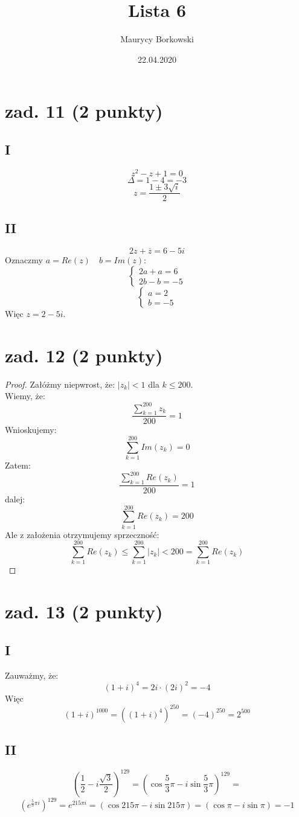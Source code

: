 \documentclass{article}
\title{Lista 6}
\date{22.04.2020}
\author{Maurycy Borkowski}
\begin{document}
\maketitle

\section{zad. 11 (2 punkty)}
\subsection*{I}
$$
z^2 - z + 1 = 0
$$
$$
\Delta = 1 - 4 = -3
$$
$$
z = \frac{1 \pm 3 \sqrt i}{2}
$$
\subsection*{II}
$$
2z + \overline{z} = 6 - 5i
$$
Oznaczmy $a = Re(z) \quad b = Im(z)$:
$$
\begin{cases} 2a + a = 6 \\ 2b - b = -5 \end{cases}
$$
$$
\begin{cases} a = 2 \\ b = -5 \end{cases}
$$
Więc $z = 2 - 5i$.
\section{zad. 12 (2 punkty)}
\begin{proof}
Załóżmy niepwrost, że: $|z_k| < 1$  dla $k \leq 200$.\\
Wiemy, że:
$$\frac{\sum_{k = 1}^{200} z_k}{200}  = 1$$
Wnioskujemy:
$$
\sum_{k = 1}^{200} Im(z_k)  = 0
$$
Zatem:
$$\frac{\sum_{k = 1}^{200} Re(z_k)}{200}  = 1$$
dalej:
$$\sum_{k = 1}^{200} Re(z_k) = 200$$
Ale z założenia otrzymujemy sprzeczność:
$$\sum_{k = 1}^{200} Re(z_k) \leq \sum_{k = 1}^{200} |z_k| < 200 = \sum_{k = 1}^{200} Re(z_k)$$
\end{proof}
\section{zad. 13 (2 punkty)}
\subsection*{I}
Zauważmy, że:
$$
{(1 + i)}^4 = 2i \cdot {(2i)}^2 = -4
$$
Więc
$$
{(1 + i)}^{1000} = {\left({(1 + i)}^4\right)}^{250} = {(-4)}^{250} = 2^{500}
$$
\subsection*{II}
$$
\left ( \frac{1}{2} - i \frac{\sqrt 3}{2} \right)^{129} = \left ( \cos {\frac{5}{3} \pi} - i \sin {\frac{5}{3} \pi} \right)^{129} = 
$$
$$
{(e^{\frac{5}{3} \pi i})}^{129} = e^{215 \pi i} = \left (\cos {215 \pi} - i \sin {215 \pi} \right) = \left (\cos {\pi} - i \sin {\pi} \right) = -1
$$
\end{document}
